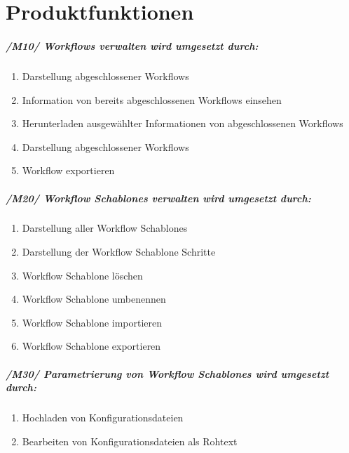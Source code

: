 \chapter{Produktfunktionen}

\paragraph{/M10/ \textit{\glspl{Workflow} verwalten} wird umgesetzt durch:}


\renewcommand{\labelenumi}{/FA\arabic{enumi}0/}
\begin{enumerate}
    \setlength\itemsep{-1em}    
    \item Darstellung abgeschlossener \glspl{Workflow}
    \item Information von bereits abgeschlossenen \glspl{Workflow} einsehen
    \item Herunterladen ausgewählter Informationen von abgeschlossenen \glspl{Workflow}
    \item Darstellung abgeschlossener \glspl{Workflow}
    \item \gls{Workflow} exportieren
    \setcounter{FAs}{\value{enumi}}
\end{enumerate}

\paragraph{/M20/ \textit{\glspl{Workflow Schablone} verwalten} wird umgesetzt durch:}
\begin{enumerate}
    \setlength\itemsep{-1em}
    \setcounter{enumi}{\value{FAs}}
    \item Darstellung aller \glspl{Workflow Schablone}
    \item Darstellung der \gls{Workflow Schablone} Schritte
    \item \gls{Workflow Schablone} löschen
    \item \gls{Workflow Schablone} umbenennen
        \item \gls{Workflow Schablone} importieren
    \item \gls{Workflow Schablone} exportieren
    \setcounter{FAs}{\value{enumi}}
\end{enumerate}

\paragraph{/M30/ \textit{Parametrierung von \glspl{Workflow Schablone}} wird umgesetzt durch:}
\begin{enumerate}
    \setlength\itemsep{-1em}
    \setcounter{enumi}{\value{FAs}}
    \item Hochladen von Konfigurationsdateien
    \item Bearbeiten von Konfigurationsdateien als Rohtext
    \setcounter{FAs}{\value{enumi}}
\end{enumerate}
\newpage
